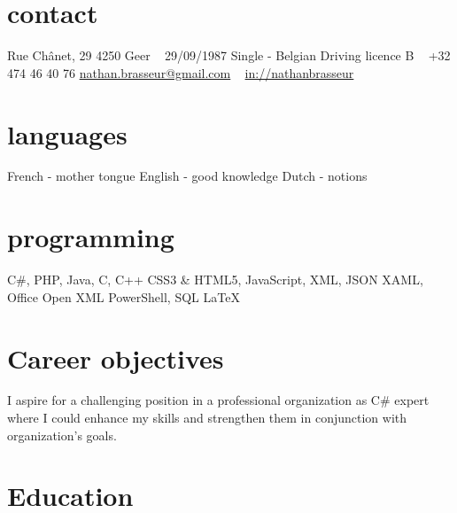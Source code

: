 \documentclass[a4paper]{cv-friggeri-x}
\begin{document}


\begin{aside} %
\section{contact}
\hfill Rue Chânet, 29
4250 Geer
~
29/09/1987
Single - Belgian
Driving licence B
~
\hfill +32 474 46 40 76
\hfill \href{mailto:nathan.brasseur@gmail.com}{nathan.brasseur@gmail.com}
~
\hfill \href{https://www.linkedin.com/in/nathanbrasseur/}{in://nathanbrasseur}\llogo 
~
\section{languages}
French - mother tongue
English - good knowledge
Dutch - notions
~
\section{programming}
C\#, PHP, Java, C, C++
CSS3 \& HTML5,
JavaScript, XML, JSON
XAML, Office Open XML
PowerShell, SQL
LaTeX
\end{aside}


\section{Career objectives}
I aspire for a challenging position in a professional organization as C\# expert where I could enhance my skills and strengthen them in conjunction with organization’s goals.


\section{Education}
\end{document}
